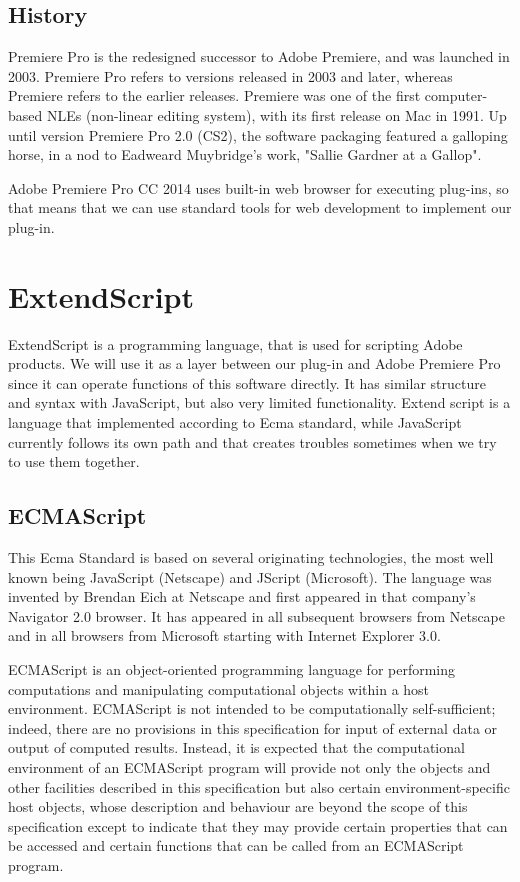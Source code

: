 \documentclass[thesis=B,english]{FITthesis}[2012/10/20]
\begin{document}
\subsection{History}
Premiere Pro is the redesigned successor to Adobe Premiere, and was launched in 2003. Premiere Pro refers to versions released in 2003 and later, whereas Premiere refers to the earlier releases. Premiere was one of the first computer-based NLEs (non-linear editing system), with its first release on Mac in 1991. Up until version Premiere Pro 2.0 (CS2), the software packaging featured a galloping horse, in a nod to Eadweard Muybridge's work, "Sallie Gardner at a Gallop".\cite{adobe}
	
Adobe Premiere Pro CC 2014 uses built-in web browser for executing plug-ins, so that means that we can use standard tools for web development to implement our plug-in.

\section{ExtendScript}
ExtendScript is a programming language, that is used for scripting Adobe products. We will use it as a layer between our plug-in and Adobe Premiere Pro since it can operate functions of this software directly. It has similar structure and syntax with JavaScript, but also very limited functionality. Extend script is a language that implemented according to Ecma standard, while JavaScript currently follows its own path and that creates troubles sometimes when we try to use them together. 
\subsection{ECMAScript}
This Ecma Standard is based on several originating technologies, the most well known being JavaScript (Netscape) and JScript (Microsoft). The language was invented by Brendan Eich at Netscape and first appeared in that company’s Navigator 2.0 browser. It has appeared in all subsequent browsers from Netscape and in all browsers from Microsoft starting with Internet Explorer 3.0.

ECMAScript is an object-oriented programming language for performing computations and manipulating computational objects within a host environment. ECMAScript is not intended to be computationally self-sufficient; indeed, there are no provisions in this specification for input of external data or output of computed results. Instead, it is expected that the computational environment of an ECMAScript program will provide not only the objects and other facilities described in this specification but also certain environment-specific host objects, whose description and behaviour are beyond the scope of this specification except to indicate that they may provide certain properties that can be accessed and certain functions that can be called from an ECMAScript program.
\end{document}
